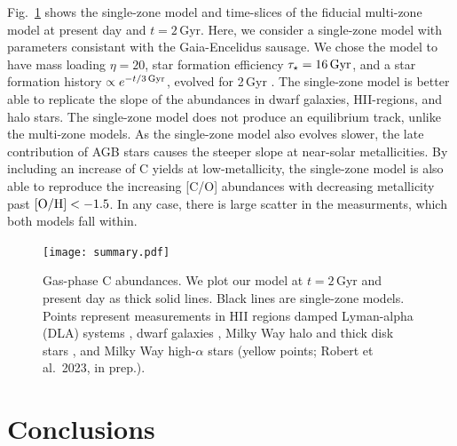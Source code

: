 \documentclass[fleqn,
usenatbib]{mnras}
\newcommand{\citealtjack}{Robert et al.~2023, in prep.}
\begin{document}
Fig.~\ref{fig:gas_phase} shows the single-zone model and time-slices of the fiducial multi-zone model at present day and $t=2$\,Gyr. 
Here, we consider a single-zone model with parameters consistant with the Gaia-Encelidus sausage\footnotemark{}. We chose the model to have mass loading $\eta=20$, star formation efficiency $\tau_{\star}=16\,{\rm Gyr}$, and a star formation history $\propto e^{-t/3{\rm\,Gyr}}$, evolved for 2\,Gyr \citep{james_dwarf}.
The single-zone model is better able to replicate the slope of the abundances in dwarf galaxies, HII-regions, and halo stars. The single-zone model does not produce an equilibrium track, unlike the multi-zone models. As the single-zone model also evolves slower, the late contribution of AGB stars causes the steeper slope at near-solar metallicities. By including an increase of C yields at low-metallicity, the single-zone model is also able to reproduce the increasing [C/O] abundances with decreasing metallicity past ${\rm [O/H]} < -1.5$. In any case, there is large scatter in the measurments, which both models fall within.





\begin{figure}
\centering
\texttt{[image: summary.pdf]}
\caption[]{Gas-phase C abundances. We plot our model at $t=2$\,Gyr and present day as thick solid lines. Black lines are single-zone models. Points represent measurements in 
    HII regions    \citep[pink circles;][]{skillman+20, esteban+02, esteban+09, esteban+14, esteban+19}
    damped Lyman-alpha (DLA) systems \citep[blue triangles;][]{ellison+10, srianand+10, dutta+14, DZ+03, pettini+08, morrison+16,cooke+17},  %
    dwarf galaxies \citep[red diamonds;][]{berg+19},
    Milky Way halo and thick disk stars \citep[green stars;][]{amarsi+19, nissen+14, fabbian+09},
    and Milky Way high-$\alpha$ stars (yellow points; \citealtjack).
}
\label{fig:gas_phase}
\end{figure}


\section{Conclusions}
\end{document}
